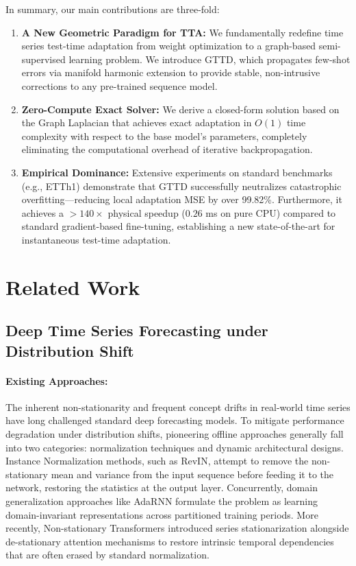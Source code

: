 \documentclass{article}
\begin{document}
	In summary, our main contributions are three-fold:
	\begin{enumerate}
		\item \textbf{A New Geometric Paradigm for TTA:} We fundamentally redefine time series test-time adaptation from weight optimization to a graph-based semi-supervised learning problem. We introduce GTTD, which propagates few-shot errors via manifold harmonic extension to provide stable, non-intrusive corrections to any pre-trained sequence model.
		\item \textbf{Zero-Compute Exact Solver:} We derive a closed-form solution based on the Graph Laplacian that achieves exact adaptation in $O(1)$ time complexity with respect to the base model's parameters, completely eliminating the computational overhead of iterative backpropagation.
		\item \textbf{Empirical Dominance:} Extensive experiments on standard benchmarks (e.g., ETTh1) demonstrate that GTTD successfully neutralizes catastrophic overfitting---reducing local adaptation MSE by over 99.82\%. Furthermore, it achieves a $>140\times$ physical speedup ($0.26$ ms on pure CPU) compared to standard gradient-based fine-tuning, establishing a new state-of-the-art for instantaneous test-time adaptation.
	\end{enumerate}

	\section{Related Work}

	\subsection{Deep Time Series Forecasting under Distribution Shift}
	\paragraph{Existing Approaches:} The inherent non-stationarity and frequent concept drifts in real-world time series have long challenged standard deep forecasting models. To mitigate performance degradation under distribution shifts, pioneering offline approaches generally fall into two categories: normalization techniques and dynamic architectural designs\cite{liu2024time, dai2024ddn, ye2024frequency}. Instance Normalization methods, such as RevIN\cite{kim2021reversible}, attempt to remove the non-stationary mean and variance from the input sequence before feeding it to the network, restoring the statistics at the output layer. Concurrently, domain generalization approaches like AdaRNN\cite{du2021adarnn} formulate the problem as learning domain-invariant representations across partitioned training periods. More recently, Non-stationary Transformers introduced series stationarization alongside de-stationary attention mechanisms to restore intrinsic temporal dependencies that are often erased by standard normalization\cite{dai2024ddn, ye2024frequency}.
	
\end{document}
